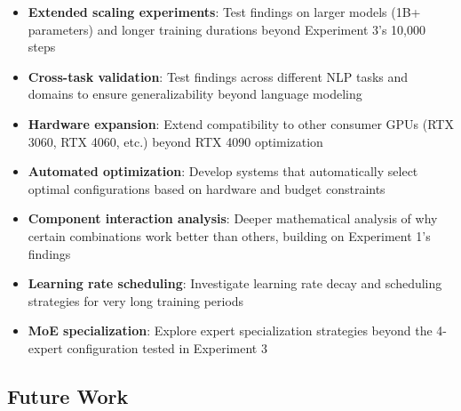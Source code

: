 \documentclass[11pt,a4paper]{article}
\begin{document}
\begin{itemize}
    \item \textbf{Extended scaling experiments}: Test findings on larger models (1B+ parameters) and longer training durations beyond Experiment 3's 10,000 steps
    \item \textbf{Cross-task validation}: Test findings across different NLP tasks and domains to ensure generalizability beyond language modeling
    \item \textbf{Hardware expansion}: Extend compatibility to other consumer GPUs (RTX 3060, RTX 4060, etc.) beyond RTX 4090 optimization
    \item \textbf{Automated optimization}: Develop systems that automatically select optimal configurations based on hardware and budget constraints
    \item \textbf{Component interaction analysis}: Deeper mathematical analysis of why certain combinations work better than others, building on Experiment 1's findings
    \item \textbf{Learning rate scheduling}: Investigate learning rate decay and scheduling strategies for very long training periods
    \item \textbf{MoE specialization}: Explore expert specialization strategies beyond the 4-expert configuration tested in Experiment 3
\end{itemize}

\subsection{Future Work}
\end{document}

